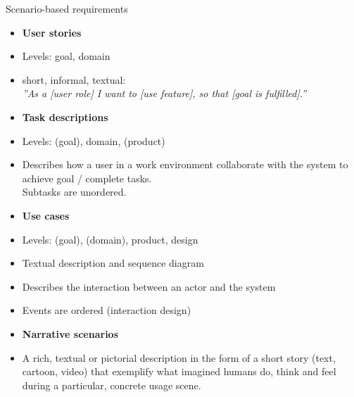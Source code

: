 \documentclass{simpleslides}
\begin{document}
\begin{frame}[fragile]{Scenario-based requirements}
\begin{itemize}\small
  \item \textbf{User stories}
  \item [] Levels: goal, domain
  \item [] short, informal, textual:\\{\footnotesize\it ''As a [user role] I want to [use feature], so that [goal is fulfilled].''} 
  \item \textbf{Task descriptions}
  \item [] Levels: (goal), domain, (product)
  \item [] Describes how a user in a work environment collaborate with the system to achieve goal / complete tasks.\\Subtasks are unordered. 
  \item \textbf{Use cases}
  \item [] Levels: (goal), (domain), product, design
  \item [] Textual description and sequence diagram
  \item [] Describes the interaction between an actor and the system
  \item [] Events are ordered (interaction design) 
  \item \textbf{Narrative scenarios}
  \item [] A rich, textual or pictorial description in the form of a short story (text, cartoon, video) that exemplify what imagined humans do, think and feel during a particular, concrete usage scene. 
\end{itemize}
\end{frame}
\end{document}
